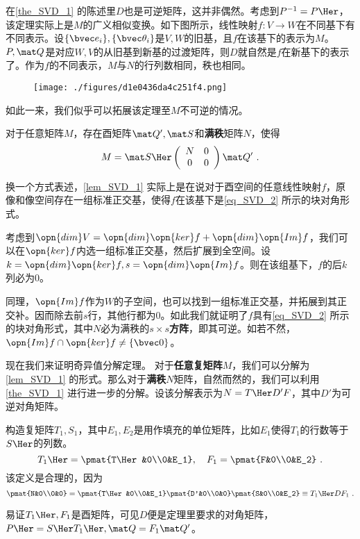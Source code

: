 在\autoref{the_SVD_1} 的陈述里$D$也是可逆矩阵，这并非偶然。考虑到$P^{-1}=P\Her $，该定理实际上是$M$的广义相似变换。如下图所示，线性映射$f:V\rightarrow W$在不同基下有不同表示。设$\{\bvec e_i\},\{\bvec \theta_i\}$是$V,W$的旧基，且$f$在该基下的表示为$M$。$P,\mat Q$是对应$W,V$的从旧基到新基的过渡矩阵，则$D$就自然是$f$在新基下的表示了。作为$f$的不同表示，$M$与$N$的行列数相同，秩也相同。
\begin{figure}[ht]
\centering
\texttt{[image: ./figures/d1e0436da4c251f4.png]}
\caption{} \label{fig_SVD_2}
\end{figure}
如此一来，我们似乎可以拓展该定理至$M$不可逆的情况。

\begin{lemma}{}\label{lem_SVD_1}
对于任意矩阵$M$，存在酉矩阵$\mat Q',\mat S$和\textbf{满秩}矩阵$N$，使得
\begin{equation}\label{eq_SVD_2}
M=\mat S\Her \left(\begin{array}{cc}
N & 0 \\
0 & 0
\end{array}\right) \mat Q'~.
\end{equation}
\end{lemma}


换一个方式表述，\autoref{lem_SVD_1} 实际上是在说对于酉空间的任意线性映射$f$，原像和像空间存在一组标准正交基，使得$f$在该基下是\autoref{eq_SVD_2} 所示的块对角形式。

考虑到$\opn{dim}V=\opn{dim}\opn{ker}f+\opn{dim}\opn{Im}f$，我们可以在$\opn{ker}f$内选一组标准正交基，然后扩展到全空间。设$k=\opn{dim}\opn{ker}f,s=\opn{dim}\opn{Im}f$。则在该组基下，$f$的后$k$列必为$0$。

同理，$\opn{Im}f$作为$W$的子空间，也可以找到一组标准正交基，并拓展到其正交补。因而除去前$s$行，其他行都为$0$。如此我们就证明了$f$具有\autoref{eq_SVD_2} 所示的块对角形式，其中$N$必为满秩的$s\times s$\textbf{方阵}，即其可逆。如若不然，$\opn{Im}f\cap\opn{ker}f\neq\{\bvec 0\}$。

现在我们来证明奇异值分解定理。
对于\textbf{任意复矩阵}$M$，我们可以分解为\autoref{lem_SVD_1} 的形式。那么对于\textbf{满秩}$N$矩阵，自然而然的，我们可以利用\autoref{the_SVD_1} 进行进一步的分解。设该分解表示为$N=T\Her D'F$，其中$D'$为可逆对角矩阵。

构造复矩阵$T_1,S_1$，其中$E_1,E_2$是用作填充的单位矩阵，比如$E_1$使得$T_1$的行数等于$S\Her $的列数。
\begin{equation}
T_1\Her =\pmat{T\Her &0\\0&E_1},\quad F_1=\pmat{F&0\\0&E_2}
~.
\end{equation}
该定义是合理的，因为
\begin{equation}
\pmat{N&0\\0&0}=\pmat{T\Her &0\\0&E_1}\pmat{D'&0\\0&0}\pmat{S&0\\0&E_2}\equiv T_1\Her DF_1~.
\end{equation}

易证$T_1\Her ,F_1$是酉矩阵，可见$D$便是定理里要求的对角矩阵，$P\Her =S\Her T_1\Her ,\mat Q=F_1\mat Q'$。
